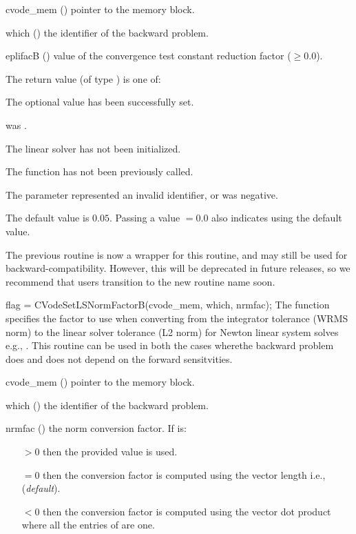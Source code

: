 {
  \begin{args}
  \item[cvode\_mem] ()
    pointer to the {\cvodes} memory block.
  \item[which] ()
    the identifier of the backward problem.
  \item[eplifacB] ()
    value of the convergence test constant reduction factor ($\geq 0.0$).
  \end{args}
}
{
  The return value  (of type ) is one of:
  \begin{args}
  \item[\Id{CVLS\_SUCCESS}]
    The optional value has been successfully set.
  \item[\Id{CVLS\_MEM\_NULL}]
     was .
  \item[\Id{CVLS\_LMEM\_NULL}]
    The {\cvls} linear solver has not been initialized.
  \item[\Id{CVLS\_NO\_ADJ}]
    The function  has not been previously called.
  \item[\Id{CVLS\_ILL\_INPUT}]
    The parameter  represented an invalid identifier, or
     was negative.
  \end{args}
}
{
  The default value is $0.05$.
  Passing a value $ = 0.0$ also indicates using the default value.


  The previous routine  is now a wrapper for this
  routine, and may still be used for backward-compatibility.  However,
  this will be deprecated in future releases, so we recommend that
  users transition to the new routine name soon.
}
{
  flag = CVodeSetLSNormFactorB(cvode\_mem, which, nrmfac);
}
{
  The function  specifies the factor to use when
  converting from the integrator tolerance (WRMS norm) to the linear solver
  tolerance (L2 norm) for Newton linear system solves e.g.,
  .
  This routine can be used in both the cases wherethe backward problem
  does and does not depend on the forward sensitvities.
}
{
  \begin{args}
  \item[cvode\_mem] ()
    pointer to the {\cvodes} memory block.
  \item[which] ()
    the identifier of the backward problem.
  \item[nrmfac] ()
    the norm conversion factor. If  is:
    \begin{itemize}
    \item[$> 0$] then the provided value is used.
    \item[$= 0$] then the conversion factor is computed using the vector length
      i.e.,  (\textit{default}).
    \item[$< 0$] then the conversion factor is computed using the vector dot
      product  where all the entries of  are
      one.
    \end{itemize}
  \end{args}
}
